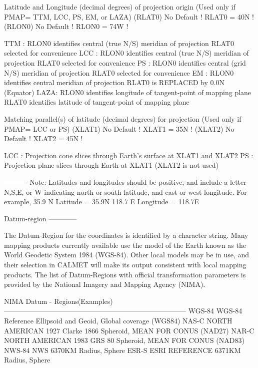 \documentclass[a4paper,10pt]{article}
\begin{document}
     Latitude and Longitude (decimal degrees) of projection origin
     (Used only if PMAP= TTM, LCC, PS, EM, or LAZA)
     (RLAT0)                    No Default      ! RLAT0 = 40N  !
     (RLON0)                    No Default      ! RLON0 = 74W  !

         TTM :  RLON0 identifies central (true N/S) meridian of projection
                RLAT0 selected for convenience
         LCC :  RLON0 identifies central (true N/S) meridian of projection
                RLAT0 selected for convenience
         PS  :  RLON0 identifies central (grid N/S) meridian of projection
                RLAT0 selected for convenience
         EM  :  RLON0 identifies central meridian of projection
                RLAT0 is REPLACED by 0.0N (Equator)
         LAZA:  RLON0 identifies longitude of tangent-point of mapping plane
                RLAT0 identifies latitude of tangent-point of mapping plane

     Matching parallel(s) of latitude (decimal degrees) for projection
     (Used only if PMAP= LCC or PS)
     (XLAT1)                    No Default      ! XLAT1 = 35N  !
     (XLAT2)                    No Default      ! XLAT2 = 45N  !

         LCC :  Projection cone slices through Earth's surface at XLAT1 and XLAT2
         PS  :  Projection plane slices through Earth at XLAT1
                (XLAT2 is not used)

     ----------
     Note:  Latitudes and longitudes should be positive, and include a
            letter N,S,E, or W indicating north or south latitude, and
            east or west longitude.  For example,
            35.9  N Latitude  =  35.9N
            118.7 E Longitude = 118.7E


     Datum-region
     ------------

     The Datum-Region for the coordinates is identified by a character
     string.  Many mapping products currently available use the model of the
     Earth known as the World Geodetic System 1984 (WGS-84).  Other local
     models may be in use, and their selection in CALMET will make its output
     consistent with local mapping products.  The list of Datum-Regions with
     official transformation parameters is provided by the National Imagery and
     Mapping Agency (NIMA).

     NIMA Datum - Regions(Examples)
     ------------------------------------------------------------------------------
     WGS-84    WGS-84 Reference Ellipsoid and Geoid, Global coverage (WGS84)
     NAS-C     NORTH AMERICAN 1927 Clarke 1866 Spheroid, MEAN FOR CONUS (NAD27)
     NAR-C     NORTH AMERICAN 1983 GRS 80 Spheroid, MEAN FOR CONUS (NAD83)
     NWS-84    NWS 6370KM Radius, Sphere
     ESR-S     ESRI REFERENCE 6371KM Radius, Sphere
\end{document}
